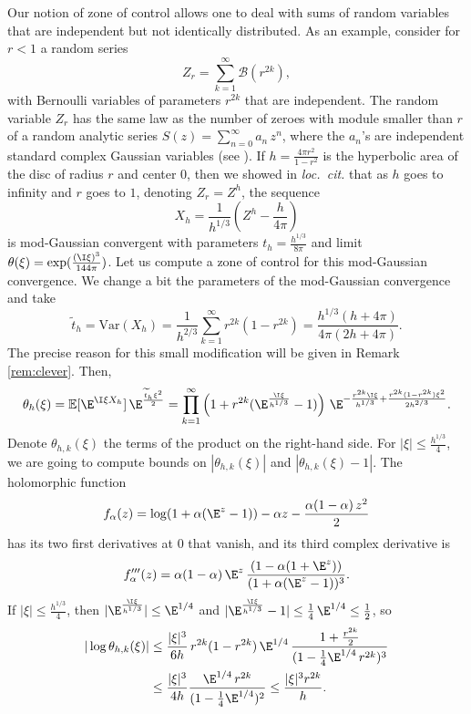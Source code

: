 \documentclass[envcountsame]{svmult}
\newcommand{\esper}{\mathbb{E}}
\newcommand{\var}{\mathrm{Var}}
\begin{document}
Our notion of zone of control allows one to deal with sums of random variables that are independent but not identically distributed. As an example, consider for $r <1$ a random series
$$Z_r=\sum_{k=1}^\infty \mathcal{B}(r^{2k}),$$
with Bernoulli variables of parameters $r^{2k}$ that are independent. The random variable  $Z_r$ has the same law as the number of zeroes with module smaller than $r$ of a random analytic series $S(z)=\sum_{n=0}^\infty a_n\,z^n$, where the $a_n$'s are independent standard complex Gaussian variables (see \cite[Section 7.1]{FMN16}). If $h = \frac{4\pi r^2}{1-r^2}$ is the hyperbolic area of the disc of radius $r$ and center $0$, then we showed in \emph{loc.~cit.} that as $h$ goes to infinity and $r$ goes to $1$, denoting $Z_r=Z^h$, the sequence 
$$X_h=\frac{1}{h^{1/3}}\left(Z^h - \frac{h}{4\pi}\right)$$
is mod-Gaussian convergent with parameters $t_h = \frac{h^{1/3}}{8\pi}$ and limit $\theta(\xi)=\exp(\frac{(\I\xi)^3}{144\pi})$. Let us compute a zone of control for this mod-Gaussian convergence. We change a bit the parameters of the mod-Gaussian convergence and take
$$\widetilde{t}_h = \var (X_h)= \frac{1}{h^{2/3}}\sum_{k=1}^\infty r^{2k}(1-r^{2k}) = \frac{h^{1/3}(h+4\pi)}{4\pi(2h+4\pi)}.$$
The precise reason for this small modification will be given in Remark \ref{rem:clever}. Then, 
$$\theta_h(\xi) = \esper[\E^{\I \xi X_h}]\,\E^{\frac{\widetilde{t}_h\xi^2}{2}} = \prod_{k=1}^\infty \left(1+r^{2k}(\E^{\frac{\I \xi}{h^{1/3}}}-1)\right)\,\E^{-\frac{r^{2k}\I\xi}{h^{1/3}}+\frac{r^{2k}(1-r^{2k})\xi^2}{2h^{2/3}}}.$$
Denote $\theta_{h,k}(\xi)$ the terms of the product on the right-hand side. For $|\xi| \leq \frac{ h^{1/3}}{4}$, we are going to compute bounds on $|\theta_{h,k}(\xi)|$ and $|\theta_{h,k}(\xi)-1|$. The holomorphic function
$$f_\alpha(z) = \log(1+\alpha(\E^z-1)) - \alpha z - \frac{\alpha(1-\alpha)\,z^2}{2}$$
has its two first derivatives at $0$ that vanish, and its third complex derivative is
$$f_\alpha'''(z) = \alpha(1-\alpha)\,\E^z\,\frac{(1-\alpha(1+\E^z))}{(1+\alpha(\E^z-1))^3}.$$
If $|\xi| \leq \frac{h^{1/3}}{4}$, then $|\E^{\frac{\I \xi}{h^{1/3}}}| \leq \E^{1/4}$ and $|\E^{\frac{\I \xi}{h^{1/3}}}-1|\leq \frac{1}{4}\,\E^{1/4} \leq \frac{1}{2} $, so
\begin{align*}
|\log \theta_{h,k}(\xi)| &\leq \frac{|\xi|^3}{6h}\,r^{2k}(1-r^{2k})\,\E^{1/4}\,\frac{1+\frac{r^{2k}}{2}}{(1-\frac{1}{4}\E^{1/4}\,r^{2k})^3} \\
&\leq \frac{|\xi|^3}{4h} \frac{\E^{1/4}\,r^{2k}}{(1-\frac{1}{4}\E^{1/4})^2}\leq \frac{|\xi|^3r^{2k}}{h}.
\end{align*}
\end{document}
